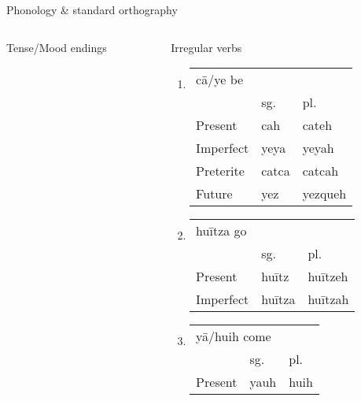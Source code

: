\documentclass[12pt]{beamer}
\newcommand{\nah}[1]{\textcolor{nahgrn}{#1}}
\newcommand{\trs}[1]{\textcolor{nahblu}{#1}}
\begin{document}
\begin{frame}
\begin{columns}[t]
\begin{column}{.22\linewidth}
\begin{block}{Phonology \& standard orthography}
\begin{threeparttable}
\begin{tablenotes}
\begin{frame}
\begin{frame}
\begin{columns}[t]
\begin{column}{.18\linewidth}
\begin{block}{Tense/Mood endings}
\begin{threeparttable}
        \end{threeparttable}
      \end{block}
    \end{column}
    \begin{column}{.18\linewidth}
      \begin{block}{Irregular verbs}
        \begin{enumerate}
<<<<<<< HEAD
        \item \begin{tabular}[t]{lll}
                \multicolumn{3}{l}{\nah{cā/ye} \trs{be}} \\
                & sg.   & pl.\\
                Present & \nah{cah} & \nah{cateh} \\
                Imperfect & \nah{yeya} & \nah{yeyah} \\
                Preterite & \nah{catca} & \nah{catcah} \\
                Future & \nah{yez} & \nah{yezqueh} \\
              \end{tabular}%
            \item \begin{tabular}[t]{lll}
                    \multicolumn{3}{l}{\nah{huītza} \trs{go}} \\
                    & sg.   & pl.\\
                    Present & \nah{huītz} & \nah{huītzeh} \\
                    Imperfect & \nah{huītza} & \nah{huītzah} \\
                  \end{tabular}%
                \item \begin{tabular}[t]{lll}
                        \multicolumn{3}{l}{\nah{yā/huih} \trs{come}} \\
                        & sg.   & pl.\\
                        Present & \nah{yauh} & \nah{huih} \\

\end{tabular}
\end{enumerate}
\end{block}
\end{column}
\end{columns}
\end{frame}
\end{frame}
\end{tablenotes}
\end{threeparttable}
\end{block}
\end{column}
\end{columns}
\end{frame}
\end{document}

